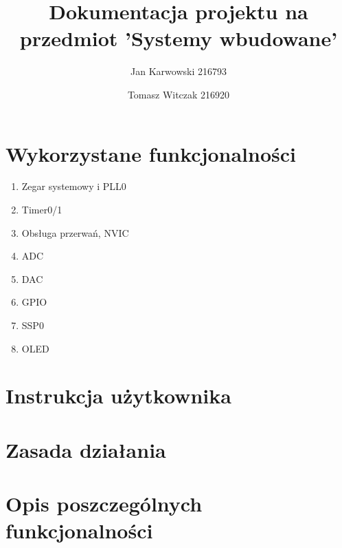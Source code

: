 \documentclass{article}
\author{
    Jan Karwowski 216793
        \and
    Tomasz Witczak 216920
}
\title{Dokumentacja projektu na przedmiot 'Systemy wbudowane'}
\begin{document}
\maketitle
\newpage

\section{Wykorzystane funkcjonalności}
\begin{enumerate}
    \item Zegar systemowy i PLL0
    \item Timer0/1
    \item Obsługa przerwań, NVIC
    \item ADC
    \item DAC
    \item GPIO
    \item SSP0
    \item OLED
\end{enumerate}

\section{Instrukcja użytkownika}


\section{Zasada działania}


\section{Opis poszczególnych funkcjonalności}








\end{document}
